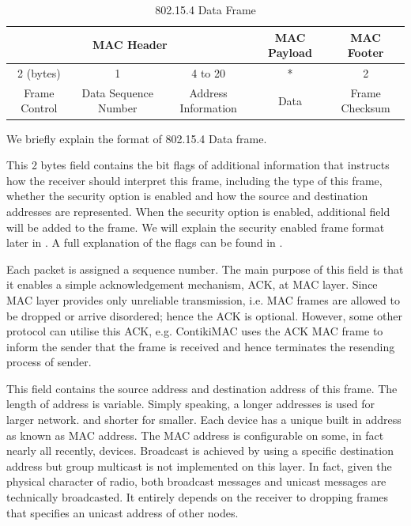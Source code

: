 \begin{table}[h!]
	\centering
	\begin{tabular}{|c|c|c|c|c|}
		\hline
		\multicolumn{3}{|c|}{MAC Header}                           & MAC Payload & MAC Footer     \\ \hline
		2 (bytes)     & 1                    & 4 to 20              & *           & 2              \\ \hline
		Frame Control & Data Sequence Number & Address Information & Data        & Frame Checksum \\ \hline
	\end{tabular}
	\caption{802.15.4 Data Frame}
	\label{Tbl: 802154 frame}
\end{table}

We briefly explain the format of 802.15.4 Data frame.
\begin{description}[style=nextline]
	\item[\textbf{Frame Control}]
	This 2 bytes field contains the bit flags of additional information that instructs how the receiver should interpret this frame, including the type of this frame, whether the security option is enabled and how the source and destination addresses are represented. When the security option is enabled, additional field will be added to the frame. We will explain the security enabled frame format later in . A full explanation of the flags can be found in \cite{802154}.
	
	\item[\textbf{Sequence Number}]
	Each packet is assigned a sequence number. The main purpose of this field is that it enables a simple acknowledgement mechanism, ACK, at MAC layer. Since MAC layer provides only unreliable transmission, i.e. MAC frames are allowed to be dropped or arrive disordered; hence the ACK is optional. However, some other protocol can utilise this ACK, e.g. ContikiMAC uses the ACK MAC frame to inform the sender that the frame is received and hence terminates the resending process of sender.
	
	\item[\textbf{Address Information}]
	This field contains the source address and destination address of this frame. The length of address is variable. Simply speaking, a longer addresses is used for larger network. and shorter for smaller. Each device has a unique built in address as known as MAC address. The MAC address is configurable on some, in fact nearly all recently, devices. Broadcast is achieved by using a specific destination address but group multicast is not implemented on this layer. In fact, given the physical character of radio, both broadcast messages and unicast messages are technically broadcasted. It entirely depends on the receiver to dropping frames that specifies an unicast address of other nodes.
	

\end{description}
